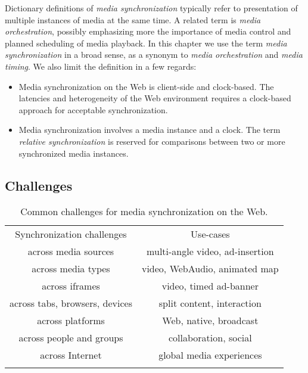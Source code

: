 Dictionary definitions of \emph{media synchronization} typically refer to
presentation of multiple instances of media at the same time. A related term
is \emph{media orchestration}, possibly emphasizing more the importance of
media control and planned scheduling of media playback. In this chapter we use
the term \emph{media synchronization} in a broad sense, as a synonym to
\emph{media orchestration} and \emph{media timing}. We also limit the
definition in a few regards:

\begin{itemize}
\item{Media synchronization on the Web is client-side and clock-based. The latencies and heterogeneity of the Web environment requires a clock-based approach for acceptable synchronization.}
\item{Media synchronization involves a media instance and a clock. The term \emph{relative synchronization} is reserved for comparisons between two or more synchronized media instances.}
\end{itemize}

\subsection{Challenges}


\begin{table}
\centering
\caption{Common challenges for media synchronization on the Web.}
\label{tab:challenges}
\setlength{\tabcolsep}{10pt}
\begin{tabular}{cc}
\hline\noalign{\smallskip}
Synchronization challenges & Use-cases \\
\noalign{\smallskip}\svhline\noalign{\smallskip}
across media sources & multi-angle video, ad-insertion \\
across media types & video, WebAudio, animated map \\
across iframes & video, timed ad-banner \\
across tabs, browsers, devices & split content, interaction \\
across platforms & Web, native, broadcast \\
across people and groups & collaboration, social \\
across Internet & global media experiences \\
\noalign{\smallskip}\hline\noalign{\smallskip}
\end{tabular}
\end{table} 



